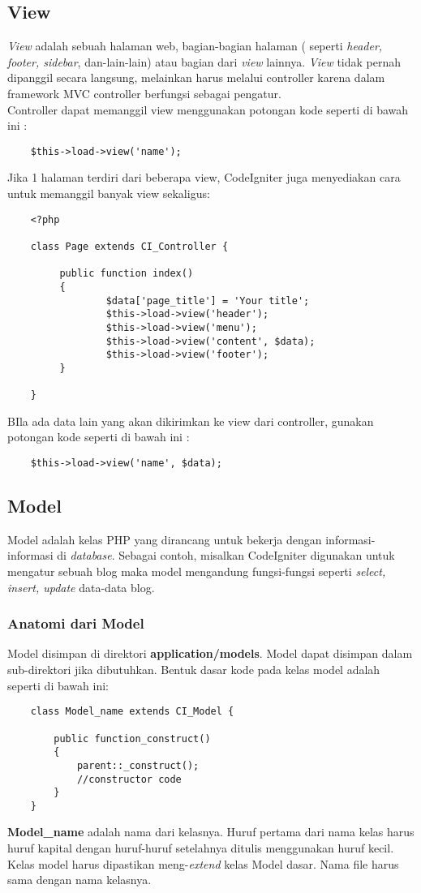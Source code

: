 \subsection{View}
\textit{View} adalah sebuah halaman web, bagian-bagian halaman ( seperti \textit{header, footer, sidebar}, dan-lain-lain) atau bagian dari \textit{view} lainnya. \textit{View} tidak pernah dipanggil secara langsung, melainkan harus melalui controller karena dalam framework MVC controller berfungsi sebagai pengatur.\cite{CodeIgniter:17} \\
Controller dapat memanggil view menggunakan potongan kode seperti di bawah ini :
\begin{lstlisting}
	$this->load->view('name');
\end{lstlisting}
Jika 1 halaman terdiri dari beberapa view, CodeIgniter juga menyediakan cara untuk memanggil banyak view sekaligus:
\begin{lstlisting}
	<?php

	class Page extends CI_Controller {

       	 public function index()
       	 {
        	     $data['page_title'] = 'Your title';
        	     $this->load->view('header');
        	     $this->load->view('menu');
       	         $this->load->view('content', $data);
       	         $this->load->view('footer');
       	 }

	}
\end{lstlisting}
BIla ada data lain yang akan dikirimkan ke view dari controller, gunakan potongan kode seperti di bawah ini :
\begin{lstlisting}
	$this->load->view('name', $data);
\end{lstlisting}

\subsection{Model}
Model adalah kelas PHP yang dirancang untuk bekerja dengan informasi-informasi di \textit{database}. Sebagai contoh, misalkan CodeIgniter digunakan untuk mengatur sebuah blog maka model mengandung fungsi-fungsi seperti \textit{select, insert, update }data-data blog. \cite{CodeIgniter:17}

\subsubsection{Anatomi dari Model}
Model disimpan di direktori \textbf{application/models}. Model dapat disimpan dalam sub-direktori jika dibutuhkan. Bentuk dasar kode pada kelas model adalah seperti di bawah ini: \cite{CodeIgniter:17}
\begin{lstlisting}
	class Model_name extends CI_Model {
	
		public function_construct()
		{
			parent::_construct();
			//constructor code
		}
	}
\end{lstlisting}
\textbf{Model\_name} adalah nama dari kelasnya. Huruf pertama dari nama kelas harus huruf kapital dengan huruf-huruf setelahnya ditulis menggunakan huruf kecil. Kelas model harus dipastikan meng-\textit{extend} kelas Model dasar. Nama file harus sama dengan nama kelasnya. \cite{CodeIgniter:17}

